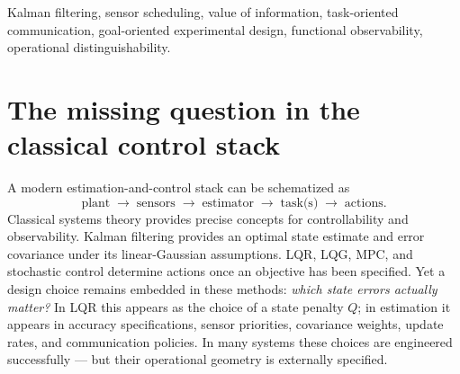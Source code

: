 \documentclass[letterpaper,onecolumn]{IEEEtran}
\theoremstyle{definition}
\theoremstyle{remark}
\begin{document}
\begin{abstract}
optical-link task probed through the belief-averaged operator; and the
multi-task tax, measured with its predicted angular shape), and the
closed-loop campaign promoted on its third seal after two registered
instrument misses whose corrections are part of the record
(\S\ref{sec:evidence}). The dynamic-relevance interface, pursued as its
own track, has its first three sealed results as well: the
age/staleness orderings cross at a point predictable in closed form,
two tasks can disagree about which of two identically-aged
histories is fresh, and a directional trigger beats the matched-budget
isotropic signal-aware threshold by 16\% --- the honest baseline
family, since signal-aware sampling already beats age-based
scheduling. The conjunction has also met its first \emph{neural}
downstream model: on a frozen, hosted, black-box language model consuming
serialized numeric state, the weight matrix recovered by query-only
logprob probing predicts the model's own held-out behavior, and
precision allocated by it at matched serialization budgets beats
task-blind allocation by 26\% while capturing the full
known-geometry advantage --- with three sealed instrument-and-design
misses preceding the promotions on the public record. OT is proposed not as a replacement for
observability, filtering, stability, or feedback, but as a complementary
theory of operational distinguishability at their downstream boundary.
\end{abstract}

\begin{IEEEkeywords}
Kalman filtering, sensor scheduling, value of information, task-oriented
communication, goal-oriented experimental design, functional observability,
operational distinguishability.
\end{IEEEkeywords}

\section{The missing question in the classical control stack}
\label{sec:intro}

A modern estimation-and-control stack can be schematized as
\begin{equation*}
\text{plant} \;\to\; \text{sensors} \;\to\; \text{estimator} \;\to\;
\text{task(s)} \;\to\; \text{actions}.
\end{equation*}
Classical systems theory provides precise concepts for controllability and
observability. Kalman filtering \cite{kalman1960} provides an optimal state
estimate and error covariance under its linear-Gaussian assumptions. LQR,
LQG, MPC, and stochastic control determine actions once an objective has been
specified. Yet a design choice remains embedded in these methods: \emph{which
state errors actually matter?} In LQR this appears as the choice of a state
penalty $Q$; in estimation it appears in accuracy specifications, sensor
priorities, covariance weights, update rates, and communication policies. In
many systems these choices are engineered successfully --- but their
operational geometry is externally specified.
\end{document}
